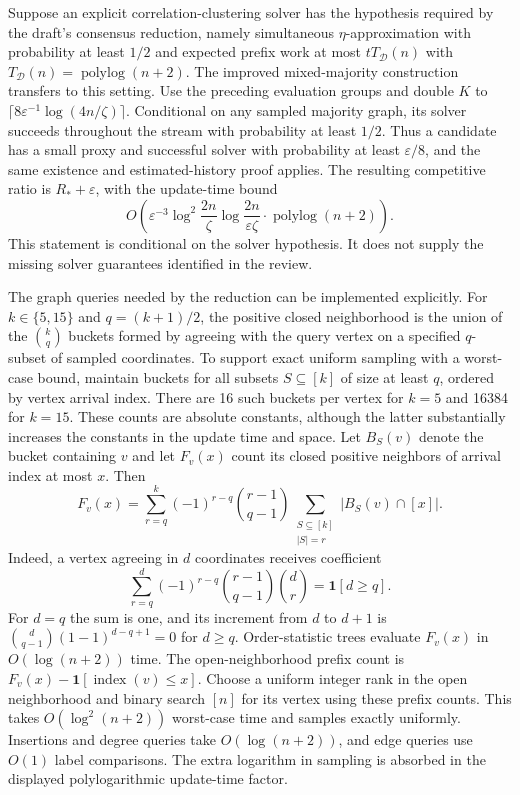 \documentclass[11pt]{article}
\begin{document}
Suppose an explicit correlation-clustering solver has the hypothesis
required by the draft's consensus reduction, namely simultaneous
$\eta$-approximation with probability at least $1/2$ and expected prefix
work at most $tT_{\mathcal D}(n)$ with $T_{\mathcal D}(n)=\operatorname{polylog}(n+2)$.
The improved mixed-majority construction transfers to this setting.
Use the preceding evaluation groups and double $K$ to
$\lceil8\varepsilon^{-1}\log(4n/\zeta)\rceil$.
Conditional on any sampled majority graph, its solver succeeds throughout
the stream with probability at least $1/2$. Thus a candidate has a small
proxy and successful solver with probability at least $\varepsilon/8$,
and the same existence and estimated-history proof applies. The resulting
competitive ratio is $R_*+\varepsilon$, with the update-time bound
\[
 O\!\left(
  \varepsilon^{-3}\log^2\frac{2n}{\zeta}
  \log\frac{2n}{\varepsilon\zeta}\cdot\operatorname{polylog}(n+2)
 \right).
\]
This statement is conditional on the solver hypothesis. It does not
supply the missing solver guarantees identified in the review.

The graph queries needed by the reduction can be implemented explicitly.
For $k\in\{5,15\}$ and $q=(k+1)/2$, the positive closed neighborhood is
the union of the $\binom{k}{q}$ buckets formed by agreeing with the query
vertex on a specified $q$-subset of sampled coordinates. To support exact
uniform sampling with a worst-case bound, maintain buckets for all
subsets $S\subseteq[k]$ of size at least $q$, ordered by vertex arrival
index. There are 16 such buckets per vertex for $k=5$ and 16384 for $k=15$.
These counts are absolute constants, although the latter substantially
increases the constants in the update time and space.
Let $B_S(v)$ denote the bucket containing $v$ and let $F_v(x)$ count its
closed positive neighbors of arrival index at most $x$. Then
\[
 F_v(x)=\sum_{r=q}^k(-1)^{r-q}\binom{r-1}{q-1}
              \sum_{\substack{S\subseteq[k]\\|S|=r}}
                    |B_S(v)\cap[ x ]|.
\]
Indeed, a vertex agreeing in $d$ coordinates receives coefficient
\[
 \sum_{r=q}^d(-1)^{r-q}\binom{r-1}{q-1}\binom dr
 =\mathbf1[d\ge q].
\]
For $d=q$ the sum is one, and its increment from $d$ to $d+1$ is
$\binom d{q-1}(1-1)^{d-q+1}=0$ for $d\ge q$.
Order-statistic trees evaluate $F_v(x)$ in $O(\log(n+2))$ time.
The open-neighborhood prefix count is
$F_v(x)-\mathbf1[\operatorname{index}(v)\le x]$.
Choose a uniform integer rank in the open neighborhood and binary search
$[n]$ for its vertex using these prefix counts. This takes
$O(\log^2(n+2))$ worst-case time and samples exactly uniformly.
Insertions and degree queries take $O(\log(n+2))$, and edge queries use
$O(1)$ label comparisons. The extra logarithm in sampling is absorbed in
the displayed polylogarithmic update-time factor.
\end{document}
